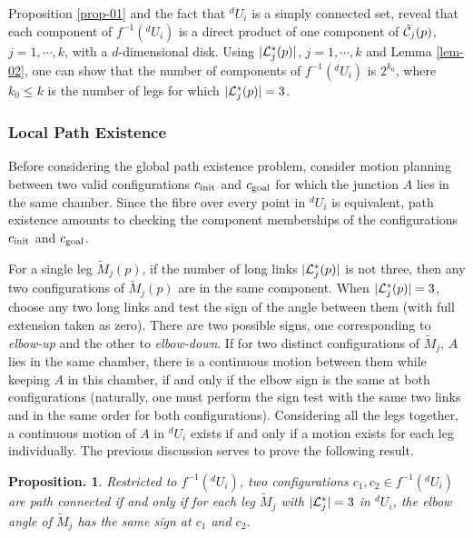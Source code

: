 \documentclass[twocolumn]{IEEEtran}
\newtheorem{Proposition}{{\bf Proposition.}}
\begin{document}
\medskip

Proposition \ref{prop-01} and the fact that ${}^d\!U_i$ is a simply
connected set, reveal that
each component
of $f^{-1}({}^d\!U_i)$
is a direct product of one component of ${\tilde {\cal C}}_j(p)$,
$j=1,\cdots,k$, with a $d$-dimensional disk. Using $|{\cal
L}_j^*(p)|$, $j=1,\cdots,k$ and Lemma \ref{lem-02}, one can show
that the number of components of $f^{-1}({}^d\!U_i)$ is $2^{k_0}$,
where $k_0 \leq k$ is the number of legs for which $|{\cal
L}_j^*(p)| = 3$.

\smallskip

\subsubsection{Local Path Existence}
Before considering the global path existence problem, consider
motion planning between two valid configurations $c_{\rm init}$ and
$c_{\rm goal}$ for which the junction $A$ lies in the same chamber.
Since the fibre over every point in ${}^d\!U_i$ is equivalent, path
existence amounts to checking the component memberships of the
configurations $c_{\rm init}$ and $c_{\rm goal}$.

For a single leg $\tilde{M}_j(p)$, if the number of long links
$|{\cal L}_j^*(p)|$ is not three, then any two configurations of
$\tilde{M}_j(p)$ are in the same component. When $|{\cal
L}_j^*(p)|=3$, choose any two long links and test the sign of the
angle between them (with full extension taken as zero).  There are
two possible signs, one corresponding to {\sl elbow-up} and the
other to {\sl elbow-down}. If for two distinct configurations of
$\tilde{M}_j$, $A$ lies in the same chamber, there is a continuous
motion between them while keeping $A$ in this chamber, if and only
if the elbow sign is the same at both configurations (naturally, one
must perform the sign test with the same two links and in the same
order for both configurations). Considering all the legs together, a
continuous motion of $A$ in ${}^d\!U_i$ exists if and only if a
motion exists for each leg individually. The previous discussion
serves to prove the following result.

\medskip

\begin{Proposition}
\label{prop-2} \rm Restricted to $f^{-1}({}^d\!U_i)$, two
configurations $c_1,c_2 \in f^{-1}({}^d\!U_i)$ are path connected if
and only if for each leg $\tilde M_j$ with $|{\cal L}_j^*|=3$ in
${}^d\!U_i$, the elbow angle of $\tilde M_j$ has the same sign at
$c_1$ and $c_2$.
\end{Proposition}
\end{document}
